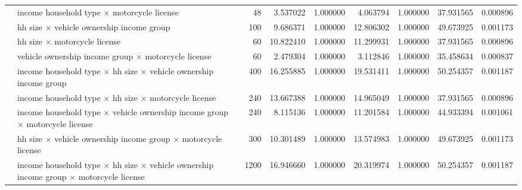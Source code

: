 \begin{tabular}{ll|r|rr|rr|rr}
 & income household type $\times$ motorcycle license & 48 & 3.537022 & 1.000000 & 4.063794 & 1.000000 & 37.931565 & 0.000896 \\
 & hh size $\times$ vehicle ownership income group & 100 & 9.686371 & 1.000000 & 12.806302 & 1.000000 & 49.673925 & 0.001173 \\
 & hh size $\times$ motorcycle license & 60 & 10.822410 & 1.000000 & 11.299931 & 1.000000 & 37.931565 & 0.000896 \\
 & vehicle ownership income group $\times$ motorcycle license & 60 & 2.479304 & 1.000000 & 3.112846 & 1.000000 & 35.458634 & 0.000837 \\
 & income household type $\times$ hh size $\times$ vehicle ownership income group & 400 & 16.255885 & 1.000000 & 19.531411 & 1.000000 & 50.254357 & 0.001187 \\
 & income household type $\times$ hh size $\times$ motorcycle license & 240 & 13.667388 & 1.000000 & 14.965049 & 1.000000 & 37.931565 & 0.000896 \\
 & income household type $\times$ vehicle ownership income group $\times$ motorcycle license & 240 & 8.115136 & 1.000000 & 11.201584 & 1.000000 & 44.933394 & 0.001061 \\
 & hh size $\times$ vehicle ownership income group $\times$ motorcycle license & 300 & 10.301489 & 1.000000 & 13.574983 & 1.000000 & 49.673925 & 0.001173 \\
 & income household type $\times$ hh size $\times$ vehicle ownership income group $\times$ motorcycle license & 1200 & 16.946660 & 1.000000 & 20.319974 & 1.000000 & 50.254357 & 0.001187 \\
\cline{1-9}
\bottomrule
\end{tabular}

